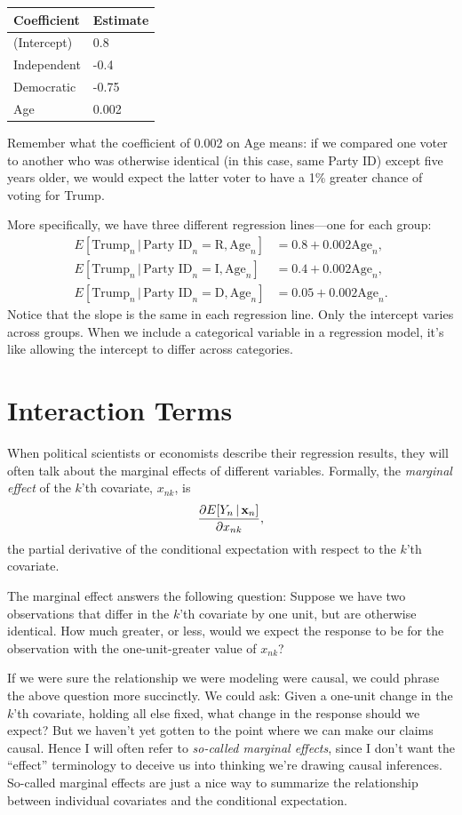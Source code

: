 \documentclass[12pt,oneside,openany]{book}
\begin{document}
\begin{longtable}[]{@{}ll@{}}
\toprule
Coefficient & Estimate\tabularnewline
\midrule
\endhead
(Intercept) & 0.8\tabularnewline
Independent & -0.4\tabularnewline
Democratic & -0.75\tabularnewline
Age & 0.002\tabularnewline
\bottomrule
\end{longtable}

Remember what the coefficient of 0.002 on Age means: if we compared one
voter to another who was otherwise identical (in this case, same Party
ID) except five years older, we would expect the latter voter to have a
1\% greater chance of voting for Trump.

More specifically, we have three different regression lines---one for
each group: \[
\begin{aligned}
  E[\text{Trump}_n \,|\, \text{Party ID}_n = \text{R}, \text{Age}_n] &= 0.8 + 0.002 \text{Age}_n, \\
  E[\text{Trump}_n \,|\, \text{Party ID}_n = \text{I}, \text{Age}_n] &= 0.4 + 0.002 \text{Age}_n, \\
  E[\text{Trump}_n \,|\, \text{Party ID}_n = \text{D}, \text{Age}_n] &= 0.05 + 0.002 \text{Age}_n.
\end{aligned}
\] Notice that the slope is the same in each regression line. Only the
intercept varies across groups. When we include a categorical variable
in a regression model, it's like allowing the intercept to differ across
categories.

\section{Interaction Terms}\label{interaction-terms}

When political scientists or economists describe their regression
results, they will often talk about the marginal effects of different
variables. Formally, the \emph{marginal effect} of the \(k\)'th
covariate, \(x_{nk}\), is \[
\frac{\partial E[Y_n \,|\, \mathbf{x}_n]}{\partial x_{nk}},
\] the partial derivative of the conditional expectation with respect to
the \(k\)'th covariate.

The marginal effect answers the following question: Suppose we have two
observations that differ in the \(k\)'th covariate by one unit, but are
otherwise identical. How much greater, or less, would we expect the
response to be for the observation with the one-unit-greater value of
\(x_{nk}\)?

If we were sure the relationship we were modeling were causal, we could
phrase the above question more succinctly. We could ask: Given a
one-unit change in the \(k\)'th covariate, holding all else fixed, what
change in the response should we expect? But we haven't yet gotten to
the point where we can make our claims causal. Hence I will often refer
to \emph{so-called marginal effects}, since I don't want the ``effect''
terminology to deceive us into thinking we're drawing causal inferences.
So-called marginal effects are just a nice way to summarize the
relationship between individual covariates and the conditional
expectation.
\end{document}
